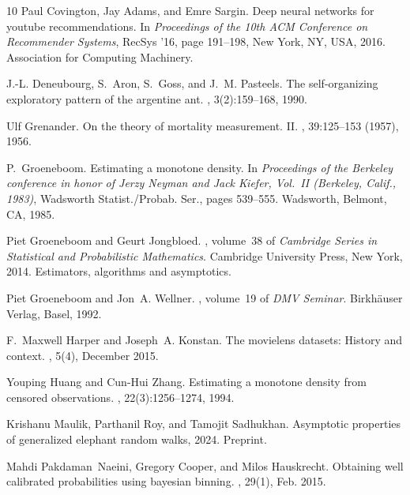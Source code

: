 \documentclass[12pt]{amsart}
\theoremstyle{plain}
\theoremstyle{remark}
\numberwithin{equation}{section}
\begin{document}
\begin{thebibliography}{10}
Paul Covington, Jay Adams, and Emre Sargin.
\newblock Deep neural networks for youtube recommendations.
\newblock In {\em Proceedings of the 10th ACM Conference on Recommender Systems}, RecSys '16, page 191–198, New York, NY, USA, 2016. Association for Computing Machinery.

J.-L. Deneubourg, S.~Aron, S.~Goss, and J.~M. Pasteels.
\newblock The self-organizing exploratory pattern of the argentine ant.
, 3(2):159--168, 1990.

Ulf Grenander.
\newblock On the theory of mortality measurement. {II}.
, 39:125--153 (1957), 1956.

P.~Groeneboom.
\newblock Estimating a monotone density.
\newblock In {\em Proceedings of the {B}erkeley conference in honor of {J}erzy {N}eyman and {J}ack {K}iefer, {V}ol.\ {II} ({B}erkeley, {C}alif., 1983)}, Wadsworth Statist./Probab. Ser., pages 539--555. Wadsworth, Belmont, CA, 1985.

Piet Groeneboom and Geurt Jongbloed.
, volume~38 of {\em Cambridge Series in Statistical and Probabilistic Mathematics}.
\newblock Cambridge University Press, New York, 2014.
\newblock Estimators, algorithms and asymptotics.

Piet Groeneboom and Jon~A. Wellner.
, volume~19 of {\em DMV Seminar}.
\newblock Birkh\"auser Verlag, Basel, 1992.

F.~Maxwell Harper and Joseph~A. Konstan.
\newblock The movielens datasets: History and context.
, 5(4), December 2015.

Youping Huang and Cun-Hui Zhang.
\newblock Estimating a monotone density from censored observations.
, 22(3):1256--1274, 1994.

Krishanu Maulik, Parthanil Roy, and Tamojit Sadhukhan.
\newblock Asymptotic properties of generalized elephant random walks, 2024.
\newblock Preprint.

Mahdi Pakdaman~Naeini, Gregory Cooper, and Milos Hauskrecht.
\newblock Obtaining well calibrated probabilities using bayesian binning.
, 29(1), Feb. 2015.


\end{thebibliography}
\end{document}
